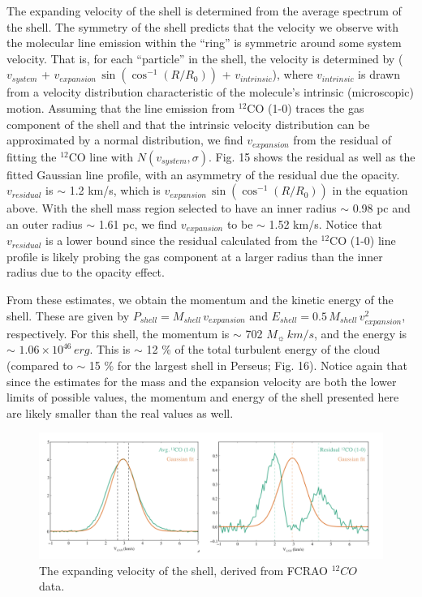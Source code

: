 \documentclass[11pt,a4paper]{emulateapj}
\begin{document}
The expanding velocity of the shell is determined from the average spectrum of the shell. The symmetry of the shell predicts that the velocity we observe with the molecular line emission within the ``ring'' is symmetric around some system velocity. That is, for each ``particle'' in the shell, the velocity is determined by ($v_{system}$ + $v_{expansion}\,\sin{\left(\cos^{-1}{\left(R/R_0\right)}\right)}$ + $v_{intrinsic}$), where $v_{intrinsic}$ is drawn from a velocity distribution characteristic of the molecule's intrinsic (microscopic) motion. Assuming that the line emission from $^{12}$CO (1-0) traces the gas component of the shell and that the intrinsic velocity distribution can be approximated by a normal distribution, we find $v_{expansion}$ from the residual of fitting the $^{12}$CO line with $N(v_{system}, \sigma)$. Fig. 15 shows the residual as well as the fitted Gaussian line profile, with an asymmetry of the residual due the opacity. $v_{residual}$ is $\sim$ 1.2 km/s, which is $v_{expansion}\,\sin{\left(\cos^{-1}{\left(R/R_0\right)}\right)}$ in the equation above. With the shell mass region selected to have an inner radius $\sim$ 0.98 pc and an outer radius $\sim$ 1.61 pc, we find $v_{expansion}$ to be $\sim$ 1.52 km/s. Notice that $v_{residual}$ is a lower bound since the residual calculated from the $^{12}$CO (1-0) line profile is likely probing the gas component at a larger radius than the inner radius due to the opacity effect.

From these estimates, we obtain the momentum and the kinetic energy of the shell. These are given by $P_{shell} = M_{shell}\,v_{expansion}$ and $E_{shell} = 0.5\,M_{shell}\,v^2_{expansion}$, respectively. For this shell, the momentum is $\sim$ 702 $M_{\sun}\,km/s$, and the energy is $\sim$ $1.06\times10^{46}\,erg$. This is $\sim$ 12 \% of the total turbulent energy of the cloud (compared to $\sim$ 15 \% for the largest shell in Perseus; Fig. 16). Notice again that since the estimates for the mass and the expansion velocity are both the lower limits of possible values, the momentum and energy of the shell presented here are likely smaller than the real values as well.

\begin{figure}[ht]
\centering
\includegraphics[scale=0.5]{fig/v_exp}
\caption{The expanding velocity of the shell, derived from FCRAO $^{12}CO$ data.
}
\end{figure}
\end{document}
